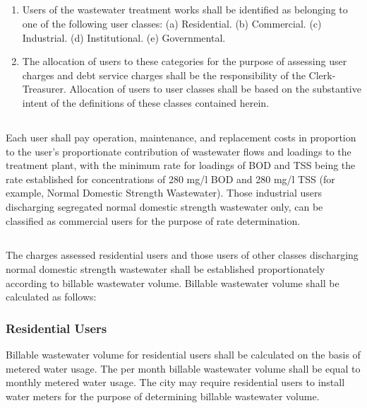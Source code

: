 \documentclass[code.tex]{subfiles}
\begin{document}
\subsection{}
\begin{enumerate}
\item Users of the wastewater treatment works shall be identified as belonging to one of the following user classes:
\newline\indent(a) Residential.
\newline\indent(b) Commercial.
\newline\indent(c) Industrial.
\newline\indent(d) Institutional.
\newline\indent(e) Governmental.
\item The allocation of users to these categories for the purpose of assessing user charges and debt service charges shall be the responsibility of the Clerk-Treasurer.  Allocation of users to user classes shall be based on the substantive intent of the definitions of these classes contained herein.
\end{enumerate}
\subsection{}
Each user shall pay operation, maintenance, and replacement costs in proportion to the user’s proportionate contribution of wastewater flows and loadings to the treatment plant, with the minimum rate for loadings of BOD and TSS being the rate established for concentrations of 280 mg/l BOD and 280 mg/l TSS (for example, Normal Domestic Strength Wastewater).  Those industrial users discharging segregated normal domestic strength wastewater only, can be classified as commercial users for the purpose of rate determination.
\subsection{}
The charges assessed residential users and those users of other classes discharging normal domestic strength wastewater shall be established proportionately according to billable wastewater volume.  Billable wastewater volume shall be calculated as follows:
\subsubsection{Residential Users}
Billable wastewater volume for residential users shall be calculated on the basis of metered water usage.  The per month billable wastewater volume shall be equal to monthly metered water usage.  The city may require residential users to install water meters for the purpose of determining billable wastewater volume.
\end{document}
